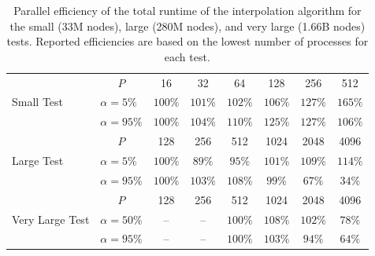 \begin{table}[ht!]
\centering
	\begin{tabular}{|l|l|cccccc|}
	\hline
	\multirow{3}{*}{Small Test} & \multicolumn{1}{|c|}{$P$} & 16      & 32      & 64      & 128     & 256    & 512 \\
	\cline{2-8} 	                            
	                            & $\alpha = 5\%$   & $100\%$ & $101\%$ & $102\%$ & $106\%$ & $127\%$& $165\%$ \\
	                            & $\alpha = 95\%$  & $100\%$ & $104\%$ & $110\%$ & $125\%$ & $127\%$& $106\%$ \\ 	                            
	\hline
	\multirow{3}{*}{Large Test} & \multicolumn{1}{|c|}{$P$} & 128     & 256     & 512     & 1024    & 2048   & 4096 \\
	\cline{2-8} 	                            
	                            & $\alpha = 5\%$   & $100\%$ & $89\%$  & $95\%$  & $101\%$ & $109\%$& $114\%$ \\
	                            & $\alpha = 95\%$  & $100\%$ & $103\%$ & $108\%$ & $99\%$  & $67\%$ & $34\%$ \\
	\hline
	\multirow{3}{*}{Very Large Test} & \multicolumn{1}{|c|}{$P$} & 128     & 256     & 512     & 1024    & 2048   & 4096 \\
	\cline{2-8} 	                            
	                            & $\alpha = 50\%$  & -- & -- & $100\%$ & $108\%$ & $102\%$& $78\%$ \\
	                            & $\alpha = 95\%$  & -- & -- & $100\%$ & $103\%$ & $94\%$ & $64\%$ \\
	\hline
	\end{tabular}
	\caption{Parallel efficiency of the total runtime of the interpolation algorithm for the small (33M nodes), large (280M nodes), and very large (1.66B nodes) tests. Reported efficiencies are based on the lowest number of processes for each test.}
	\label{tab:scaling_interpolation}
\end{table}

